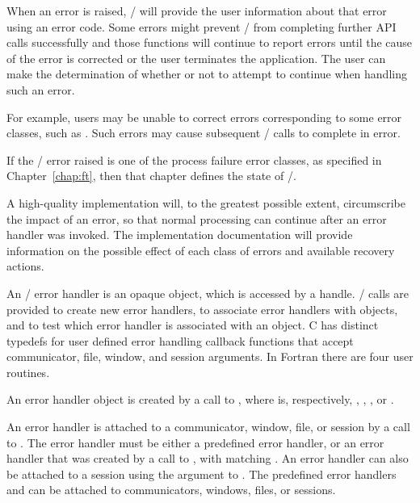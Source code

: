 When an error is raised, \MPI/ will provide the user information
about that error using an error code. Some errors might prevent \MPI/
from completing further API calls successfully and those functions will continue
to report errors until the cause of the error is corrected or the user terminates the
application. The user can make the determination of whether or not to attempt to
continue when handling such an error.

\begin{users}
    For example, users may be unable to correct errors corresponding to some error classes, such as
    . Such errors may cause subsequent \MPI/ calls to complete in error.
\end{users}

If the \MPI/ error raised is one of the process failure error
classes, as specified in Chapter~\ref{chap:ft}, then that chapter
defines the state of \MPI/.

\begin{implementors}
A high-quality implementation will, to the greatest possible extent,
circumscribe the impact of an error, so that normal processing can
continue after an error handler was invoked.  The implementation
documentation will
provide information on the possible effect of each class of errors and available
recovery actions.
\end{implementors}

An \MPI/ error handler is an opaque object, which is accessed by a handle.
\MPI/ calls are provided to create new error handlers, to associate error
handlers with objects, and to test which error handler is associated with
an object.
C has
distinct typedefs for user defined error handling callback
functions that 
accept
communicator, file, window, and session arguments.
In Fortran there are four user routines.

An error handler object is created by a call to
%
%
%
%
, where
\mpiskipfunc{\XXX/} is, respectively, ,
, , or .

An error handler is attached to a communicator, window, file, or session
%
%
%
%
by a call to .  The error handler
must be either a predefined error handler, or an error handler that
was created by a call to , with
matching \mpiskipfunc{\XXX/}.
An error handler can also be attached to a session
using the  argument to .
The predefined error handlers  and
 can be attached to
communicators, windows, files, or sessions.

